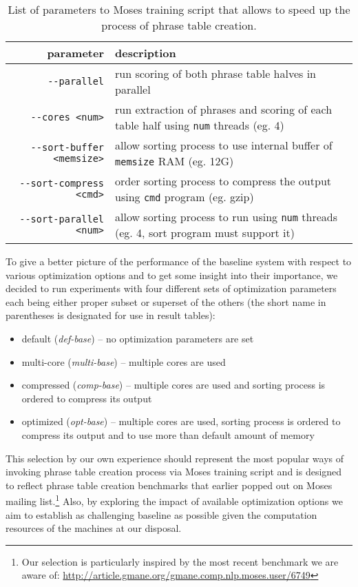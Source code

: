 \begin{table}[ht]
\centering
\begin{tabular}{ r p{86mm} }
parameter & description \\
\hline
\hline
\verb|--parallel|               & run scoring of both phrase table halves in parallel \\
\verb|--cores <num>|            & run extraction of phrases and scoring of each table half using \verb|num| threads (eg. 4) \\
\verb|--sort-buffer <memsize>|  & allow sorting process to use internal buffer of \verb|memsize| RAM (eg. 12G)\\
\verb|--sort-compress <cmd>|    & order sorting process to compress the output using \verb|cmd| program (eg. gzip) \\
\verb|--sort-parallel <num>|    & allow sorting process to run using \verb|num| threads (eg. 4, sort program must support it)\\
\hline
\hline
\end{tabular}
\caption{\label{baseline-optimization-parameters}
List of parameters to Moses training script that allows to speed up
the process of phrase table creation.}
\end{table}

To give a better picture of the performance of the baseline system with respect
to various optimization options and to get some insight into their importance,
we decided to run experiments with four different sets of optimization parameters
each being either proper subset or superset of the others (the short name in
parentheses is designated for use in result tables):
\begin{itemize}
  \item default (\emph{def-base}) -- no optimization parameters are set
  \item multi-core (\emph{multi-base}) -- multiple cores are used
  \item compressed (\emph{comp-base}) -- multiple cores are used and
    sorting process is ordered to compress its output
  \item optimized (\emph{opt-base}) -- multiple cores are used, sorting process
    is ordered to compress its output and to use more than default amount of memory
\end{itemize}

This selection by our own experience should represent the most popular ways of
invoking phrase table creation process via Moses training script and is designed to
reflect phrase table creation benchmarks that earlier popped out on Moses mailing
list.\footnote{Our selection is particularly inspired by the most recent benchmark
we are aware of: \url{http://article.gmane.org/gmane.comp.nlp.moses.user/6749}}
Also, by exploring the impact of available optimization options we aim to establish
as challenging baseline as possible given the computation resources of the machines
at our disposal.


